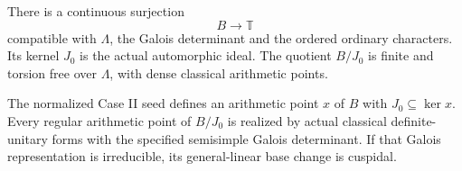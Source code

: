 \begin{srproposition}\label{prop:sr-case-two-hecke-quotient}
There is a continuous surjection
\[
                             B\longrightarrow\mathbb T
 \tag{H12}
\]
compatible with \(\Lambda\), the Galois determinant and
the ordered ordinary characters.
Its kernel \(J_0\) is the actual automorphic ideal.
The quotient \(B/J_0\) is finite and torsion free over
\(\Lambda\), with dense classical arithmetic points.

The normalized Case II seed defines an arithmetic point
\(x\) of \(B\) with \(J_0\subseteq\ker x\).
Every regular arithmetic point of \(B/J_0\) is realized
by actual classical definite-unitary forms with the
specified semisimple Galois determinant.
If that Galois representation is irreducible, its
general-linear base change is cuspidal.
\end{srproposition}
